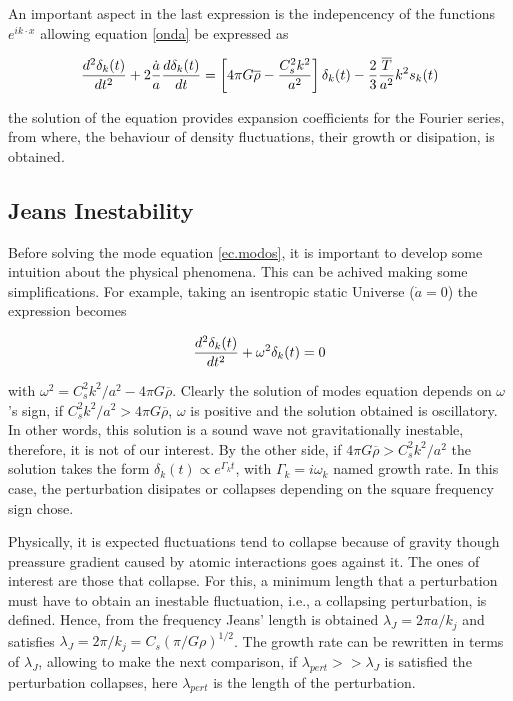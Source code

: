 An important aspect in the last expression is the indepencency of the 
functions $e^{ik\cdot x}$ allowing equation \ref{onda} be expressed as 

\begin{equation}
\frac{d^2\delta_k(t)}{dt^2}+2\frac{\dot{a}}{a}\frac{d \delta_k(t)}{d t} = 
\left[4\pi G\overline{\rho}-\frac{C_s^2 k^2}{a^2}\right]\delta_k(t)
-\frac{2}{3}\frac{\overline{T}}{a^2}k^2s_k(t)
\label{ec.modos}
\end{equation}

the solution of the equation provides expansion coefficients for the Fourier series,
from where, the behaviour of density fluctuations, their growth or 
disipation, is obtained. 

\subsection{ Jeans Inestability}

Before solving the mode equation \ref{ec.modos}, it is important to develop
some intuition about the	 physical phenomena. This can be achived making some 
simplifications. For example, taking an isentropic static Universe ($\dot{a}=0$)
the expression becomes

\[
\frac{d^2\delta_k(t)}{dt^2} + \omega^2\delta_k(t) = 0
\]

with $\omega^2 = C_s^2k^2/a^2-4\pi G\overline{\rho}$. Clearly the solution of modes 
equation depends on $\omega$'s sign, if $C_s^2k^2/a^2>4\pi G\overline{\rho}$,  
$\omega$ is positive and the solution obtained is oscillatory. In other words, 
this solution is a sound wave not gravitationally inestable, therefore, it is
not of our interest. 
By the other side, if $4\pi G\overline{\rho}>C_s^2k^2/a^2$ the solution takes
the form $\delta_k(t)\propto e^{\Gamma_k t}$, with $\Gamma_k=i\omega_k$ named
growth rate. In this case, the perturbation disipates or collapses depending
on the square frequency sign chose. 

Physically, it is expected fluctuations tend to collapse 
because of gravity though preassure gradient caused by atomic
interactions goes against it. The ones of interest are those
that collapse. For this, a minimum length that a perturbation
must have to obtain an inestable fluctuation, i.e., a collapsing
perturbation, is defined. Hence, from the frequency Jeans' length
is obtained $\lambda_J = 2\pi a/k_j$ and satisfies 
$\lambda_J = 2\pi/k_j = C_s(\pi/G\rho)^{1/2}$.
The growth rate can be rewritten in terms of $\lambda_J$, 
allowing to make the next comparison, if $\lambda_{pert}>>\lambda_J$
is satisfied the perturbation collapses, here $\lambda_{pert}$
is the length of the perturbation.

